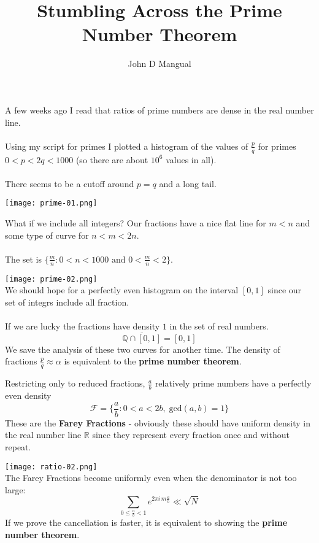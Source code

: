 \documentclass[12pt]{article}
\title{\textbf{ Stumbling Across the Prime Number Theorem }}
\author{John D Mangual}
\date{}
\begin{document}
\selectfont \fontsize{25}{30}\selectfont

\maketitle

\noindent A few weeks ago I read that ratios of prime numbers are dense in the real number line. \\ \\
Using my script for primes I plotted a histogram of the values of $\frac{p}{q}$ for primes $0 < p < 2q < 1000$ (so there are about $10^6$ values in all).  \\ \\
There seems to be a cutoff around $p = q$ and a long tail.

\texttt{[image: prime-01.png]}

\newpage

\noindent What if we include all integers?  Our fractions have a nice flat line for $m < n$ and some type of curve for $n < m < 2n$. \\ \\
The set is $\{ \frac{m}{n}: 0 < n <  1000 \text{ and } 0 < \frac{m}{n} < 2 \}$.

\texttt{[image: prime-02.png]} \\
We should hope for a perfectly even histogram on the interval $[0,1]$ since our set of integrs include all fraction.  \\ \\If we are lucky the fractions have density $1$ in the set of real numbers.
$$ \overline{\mathbb{Q} \cap [0,1]} = [0,1] $$
We save the analysis of these two curves for another time.  The density of fractions $\frac{p}{q}\approx \alpha $ is equivalent to the \textbf{prime number theorem}.


\newpage

\noindent Restricting only to reduced fractions, $\frac{a}{b}$ relatively prime numbers have a perfectly even density
$$ \mathcal{F}=\big\{ \frac{a}{b}: 0 < a < 2b, \;\text{gcd}(a,b)=1 \big\} $$
These are the \textbf{Farey Fractions} - obviously these should have uniform density in the real number line $\mathbb{R}$ since they represent every fraction once and without repeat.

\texttt{[image: ratio-02.png]} \\
The Farey Fractions become uniformly even when the denominator is not too large:
$$ \sum_{0 \leq \frac{a}{b}< 1} e^{2\pi i \, m\frac{a}{b}} \ll \sqrt{N}$$
If we prove the cancellation is faster, it is equivalent to showing the \textbf{prime number theorem}.
\end{document}
